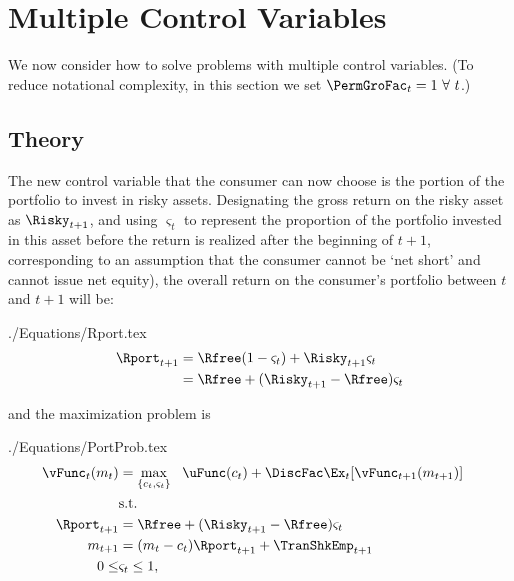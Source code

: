 \documentclass[titlepage, headings=optiontotocandhead]{\econtex}
\begin{document}
\hypertarget{Multiple-Control-Variables}{}
\section{Multiple Control Variables}

We now consider how to solve problems with multiple control variables.
(To reduce notational complexity, in this section we set $\PermGroFac_{t}=1~\forall~t$.)

\subsection{Theory}
The new control variable that the consumer can now choose is the portion of the portfolio to invest in risky assets.  Designating the gross return on the risky asset as $\Risky_{t+1}$, and using $\varsigma_{t}$ to represent the proportion of the portfolio invested in this asset before the return is realized after the beginning of $t+1$, corresponding to an assumption that the consumer cannot be `net short' and cannot issue net equity), the overall return on the consumer's portfolio between $t$ and $t+1$ will be:
\begin{verbatimwrite}{./Equations/Rport.tex}
  \begin{equation}\begin{gathered}\begin{aligned}
        \Rport_{t+1}  & = \Rfree(1-\varsigma_{t}) + \Risky_{t+1}\varsigma_{t} \label{eq:return1}
        \\               & = \Rfree + (\Risky_{t+1}-\Rfree) \varsigma_{t} %
      \end{aligned}\end{gathered}\end{equation}
\end{verbatimwrite}
\unskip
and the maximization problem is
\begin{verbatimwrite}{./Equations/PortProb.tex}
  \begin{equation*}\begin{gathered}\begin{aligned}
        {\vFunc}_{t}({m}_{t})  & = \max_{\{{c}_{t},\varsigma_{t}\}}   ~~ \uFunc({c}_{t}) +  \DiscFac
        \Ex_{t}[{\vFunc}_{t+1}({m}_{t+1})]
        \\      & \text{s.t.} & \nonumber
        \\      \Rport_{t+1}  & = \Rfree + (\Risky_{t+1}-\Rfree) \varsigma_{t}
        \\      {m}_{t+1}  & = ({m}_{t}-{c}_{t})\Rport_{t+1} + \TranShkEmp_{t+1}
        \\  0       \leq & \varsigma_{t}  \leq 1, \label{eq:noshorts}
      \end{aligned}\end{gathered}\end{equation*}
\end{verbatimwrite}
\end{document}
